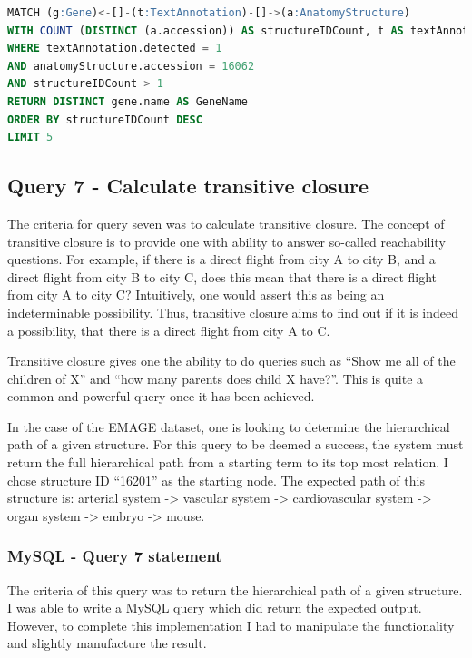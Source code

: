 \begin{lstlisting}[language=SQL, caption=Neo4j query 6 statement. Which Genes are most commonly co-expressed?., label=code:neoquery6]
MATCH (g:Gene)<-[]-(t:TextAnnotation)-[]->(a:AnatomyStructure)
WITH COUNT (DISTINCT (a.accession)) AS structureIDCount, t AS textAnnotation, a AS anatomyStructure, g AS gene
WHERE textAnnotation.detected = 1
AND anatomyStructure.accession = 16062
AND structureIDCount > 1
RETURN DISTINCT gene.name AS GeneName
ORDER BY structureIDCount DESC
LIMIT 5
\end{lstlisting}


\subsection*{Query 7 - Calculate transitive closure}\label{query7}
The criteria for query seven was to calculate transitive closure. The concept of transitive closure is to provide one with ability to answer so-called reachability questions. For example, if there is a direct flight from city A to city B, and a direct flight from city B to city C, does this mean that there is a direct flight from city A to city C? Intuitively, one would assert this as being an indeterminable possibility. Thus, transitive closure aims to find out if it is indeed a possibility, that there is a direct flight from city A to C.

Transitive closure gives one the ability to do queries such as ``Show me all of the children of X'' and ``how many parents does child X have?''. This is quite a common and powerful query once it has been achieved.

In the case of the EMAGE dataset, one is looking to determine the hierarchical path of a given structure. For this query to be deemed a success, the system must return the full hierarchical path from a starting term to its top most relation. I chose structure ID ``16201'' as the starting node. The expected path of this structure is: arterial system -> vascular system -> cardiovascular system -> organ system -> embryo -> mouse.

\subsubsection*{MySQL - Query 7 statement}\label{mysqlquery7statement}
The criteria of this query was to return the hierarchical path of a given structure. I was able to write a MySQL query which did return the expected output. However, to complete this implementation I had to manipulate the functionality and slightly manufacture the result.

